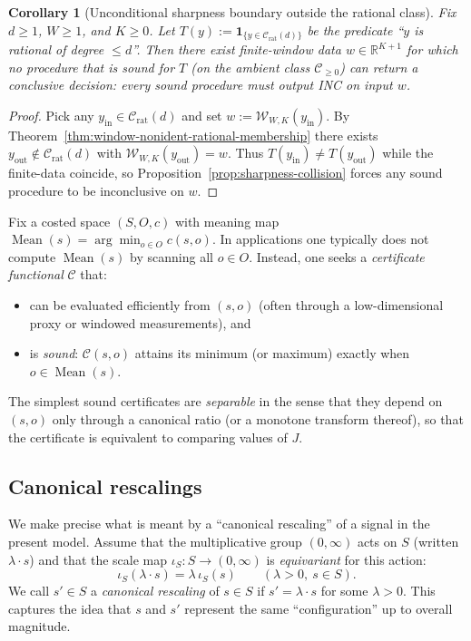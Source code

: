 \documentclass[11pt,reqno]{amsart}
\newtheorem{corollary}[theorem]{Corollary}
\theoremstyle{definition}
\theoremstyle{remark}
\newcommand{\R}{\mathbb{R}}
\newcommand{\1}{\mathbf{1}}
\newcommand{\Mean}{\operatorname{Mean}}
\begin{document}
\begin{corollary}[Unconditional sharpness boundary outside the rational class]\label{cor:window-sharpness-unconditional}
Fix $d\ge 1$, $W\ge 1$, and $K\ge 0$.
Let $T(y):=\mathbf 1_{\{y\in\mathcal C_{\mathrm{rat}}(d)\}}$ be the predicate ``$y$ is rational of degree $\le d$''.
Then there exist finite-window data $w\in\R^{K+1}$ for which no procedure that is sound for $T$
(on the ambient class $\mathcal C_{\ge 0}$) can return a conclusive decision: every sound procedure must output \textsf{INC} on input $w$.
\end{corollary}

\begin{proof}
Pick any $y_{\mathrm{in}}\in\mathcal C_{\mathrm{rat}}(d)$ and set $w:=\mathcal W_{W,K}(y_{\mathrm{in}})$.
By Theorem~\ref{thm:window-nonident-rational-membership} there exists
$y_{\mathrm{out}}\notin\mathcal C_{\mathrm{rat}}(d)$ with $\mathcal W_{W,K}(y_{\mathrm{out}})=w$.
Thus $T(y_{\mathrm{in}})\neq T(y_{\mathrm{out}})$ while the finite-data coincide, so
Proposition~\ref{prop:sharpness-collision} forces any sound procedure to be inconclusive on $w$.
\end{proof}

Fix a costed space $(S,O,c)$ with meaning map $\Mean(s)=\arg\min_{o\in O}c(s,o)$.
In applications one typically does not compute $\Mean(s)$ by scanning all $o\in O$.
Instead, one seeks a \emph{certificate functional} $\mathcal{C}$ that:

\begin{itemize}
\item can be evaluated efficiently from $(s,o)$ (often through a low-dimensional
 proxy or windowed measurements), and
\item is \emph{sound}: $\mathcal{C}(s,o)$ attains its minimum (or maximum) exactly
 when $o\in\Mean(s)$.
\end{itemize}

The simplest sound certificates are \emph{separable} in the sense that they depend
on $(s,o)$ only through a canonical ratio (or a monotone transform thereof), so
that the certificate is equivalent to comparing values of $J$.

\subsection{Canonical rescalings}\label{subsec:canon-rescale}

We make precise what is meant by a ``canonical rescaling'' of a signal in the present model.
Assume that the multiplicative group $(0,\infty)$ acts on $S$ (written $\lambda\cdot s$) and that
the scale map $\iota_S:S\to(0,\infty)$ is \emph{equivariant} for this action:
\[
\iota_S(\lambda\cdot s)=\lambda\,\iota_S(s)\qquad(\lambda>0,\ s\in S).
\]
We call $s' \in S$ a \emph{canonical rescaling} of $s\in S$ if $s'=\lambda\cdot s$ for some $\lambda>0$.
This captures the idea that $s$ and $s'$ represent the same ``configuration'' up to overall magnitude.
\end{document}
